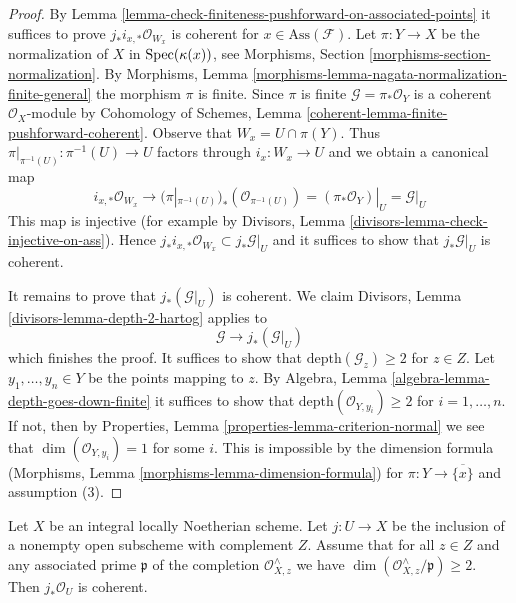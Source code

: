 \begin{proof}
By Lemma \ref{lemma-check-finiteness-pushforward-on-associated-points}
it suffices to prove $j_*i_{x, *}\mathcal{O}_{W_x}$ is coherent
for $x \in \text{Ass}(\mathcal{F})$.
Let $\pi : Y \to X$ be the normalization of $X$ in $\mathop{\mathrm{Spec}}(\kappa(x))$, see
Morphisms, Section \ref{morphisms-section-normalization}. By
Morphisms, Lemma \ref{morphisms-lemma-nagata-normalization-finite-general}
the morphism $\pi$ is finite. Since $\pi$ is finite
$\mathcal{G} = \pi_*\mathcal{O}_Y$ is a coherent $\mathcal{O}_X$-module by
Cohomology of Schemes, Lemma \ref{coherent-lemma-finite-pushforward-coherent}.
Observe that $W_x = U \cap \pi(Y)$. Thus
$\pi|_{\pi^{-1}(U)} : \pi^{-1}(U) \to U$ factors through $i_x : W_x \to U$
and we obtain a canonical map
$$
i_{x, *}\mathcal{O}_{W_x}
\longrightarrow
(\pi|_{\pi^{-1}(U)})_*(\mathcal{O}_{\pi^{-1}(U)}) =
(\pi_*\mathcal{O}_Y)|_U = \mathcal{G}|_U
$$
This map is injective (for example by Divisors, Lemma
\ref{divisors-lemma-check-injective-on-ass}). Hence
$j_*i_{x, *}\mathcal{O}_{W_x} \subset j_*\mathcal{G}|_U$
and it suffices to show that $j_*\mathcal{G}|_U$ is coherent.

\medskip\noindent
It remains to prove that $j_*(\mathcal{G}|_U)$ is coherent. We claim
Divisors, Lemma \ref{divisors-lemma-depth-2-hartog}
applies to
$$
\mathcal{G} \longrightarrow j_*(\mathcal{G}|_U)
$$
which finishes the proof. It suffices to show that
$\text{depth}(\mathcal{G}_z) \geq 2$ for $z \in Z$.
Let $y_1, \ldots, y_n \in Y$ be the points mapping to $z$.
By Algebra, Lemma \ref{algebra-lemma-depth-goes-down-finite}
it suffices to show that
$\text{depth}(\mathcal{O}_{Y, y_i}) \geq 2$ for $i = 1, \ldots, n$.
If not, then by Properties, Lemma \ref{properties-lemma-criterion-normal}
we see that $\dim(\mathcal{O}_{Y, y_i}) = 1$ for some $i$.
This is impossible by the dimension formula
(Morphisms, Lemma \ref{morphisms-lemma-dimension-formula})
for $\pi : Y \to \overline{\{x\}}$ and assumption (3).
\end{proof}

\begin{lemma}
\label{lemma-sharp-finiteness-pushforward}
Let $X$ be an integral locally Noetherian scheme. Let $j : U \to X$
be the inclusion of a nonempty open subscheme with complement $Z$. Assume
that for all $z \in Z$ and any associated prime $\mathfrak p$ of
the completion $\mathcal{O}_{X, z}^\wedge$
we have $\dim(\mathcal{O}_{X, z}^\wedge/\mathfrak p) \geq 2$.
Then $j_*\mathcal{O}_U$ is coherent.
\end{lemma}

